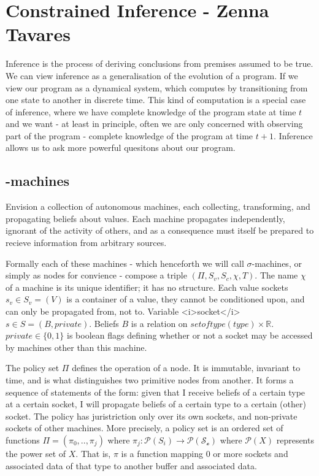 
\chapter{Constrained Inference - Zenna Tavares} %

Inference is the process of deriving conclusions from premises assumed to be true.
We can view inference as a generalisation of the evolution of a program.
If we view our program as a dynamical system, which computes by transitioning from one state to another in discrete time.
This kind of computation is a special case of inference, where we have complete knowledge of the program state at time $t$ and we want - at least in principle, often we are only concerned with observing part of the program - complete knowledge of the program at time $t+1$.
Inference allows us to ask more powerful quesitons about our program.

\section{\sigma-machines}
Envision a collection of autonomous machines, each collecting, transforming, and propagating beliefs about values.
Each machine propagates independently, ignorant of the activity of others, and as a consequence must itself be prepared to recieve information from arbitrary sources.

Formally each of these machines - which henceforth we will call $\sigma$-machines, or simply as nodes for convience - compose a triple $\left(\Pi,S_v, S_c,\chi, T\right)$.
The name $\chi$ of a machine is its unique identifier; it has no structure.
Each value sockets $s_v \in S_v = (V)$ is a container of a value, they cannot be conditioned upon, and can only be propagated from, not to.
Variable <i>socket</i> $s \in S = (B,private)$.
Beliefs $B$ is a relation on $setoftype(type) \times \mathbb{R}$.
$private \in \{0,1\}$ is boolean flags defining whether or not a socket may be accessed by machines other than this machine.

The policy set $\Pi$ defines the operation of a node.  It is immutable, invariant to time, and is what distinguishes two primitive nodes from another.
It forms a sequence of statements of the form: given that I receive beliefs of a certain type at a certain socket, I will propagate beliefs of a certain type to a certain (other) socket.
The policy has juristriction only over its own sockets, and non-private sockets of other machines.
More precisely, a policy set is an ordered set of functions $\Pi = (\pi_0, .. , \pi_j)$  where $\pi_j : \mathcal{P}(S_i) \rightarrow \mathcal{P(S_o)}$ where $\mathcal{P}(X)$ represents the power set of $X$.
That is, $\pi$ is a function mapping 0 or more sockets and associated data of that type to another buffer and associated data.

